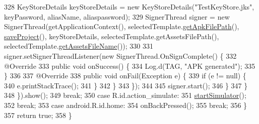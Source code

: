 \begin{DoxyCode}
328                                 KeyStoreDetails keyStoreDetails = \textcolor{keyword}{new} KeyStoreDetails(\textcolor{stringliteral}{"TestKeyStore.jks"}, 
      keyPassword, aliasName, aliaspassword);
329                                 SignerThread signer = \textcolor{keyword}{new} SignerThread(getApplicationContext(), 
      selectedTemplate.\hyperlink{interfaceorg_1_1buildmlearn_1_1toolkit_1_1model_1_1TemplateInterface_a1bca348acb3790aebce645c04a9e0945}{getApkFilePath}(), \hyperlink{classorg_1_1buildmlearn_1_1toolkit_1_1activity_1_1TemplateEditor_aaec7f80eb29a74505a25bed11c20c29d}{saveProject}(), keyStoreDetails, 
      selectedTemplate.getAssetsFilePath(), selectedTemplate.\hyperlink{interfaceorg_1_1buildmlearn_1_1toolkit_1_1model_1_1TemplateInterface_a5336064bba45a1ba2f6db891567e1b6e}{getAssetsFileName}());
330 
331                                 signer.setSignerThreadListener(\textcolor{keyword}{new} SignerThread.OnSignComplete() \{
332                                     @Override
333                                     \textcolor{keyword}{public} \textcolor{keywordtype}{void} onSuccess() \{
334                                         Log.d(TAG, \textcolor{stringliteral}{"APK generated"});
335                                     \}
336 
337                                     @Override
338                                     \textcolor{keyword}{public} \textcolor{keywordtype}{void} onFail(Exception e) \{
339                                         \textcolor{keywordflow}{if} (e != null) \{
340                                             e.printStackTrace();
341                                         \}
342                                     \}
343                                 \});
344 
345                                 signer.start();
346                         \}
347                     \}
348                 \}).show();
349                 \textcolor{keywordflow}{break};
350             \textcolor{keywordflow}{case} R.id.action\_simulate:
351                 \hyperlink{classorg_1_1buildmlearn_1_1toolkit_1_1activity_1_1TemplateEditor_a0f4842fdb6b28f218c6f2ac5c69e62e1}{startSimulator}();
352                 \textcolor{keywordflow}{break};
353             \textcolor{keywordflow}{case} android.R.id.home:
354                 onBackPressed();
355                 \textcolor{keywordflow}{break};
356         \}
357         \textcolor{keywordflow}{return} \textcolor{keyword}{true};
358     \}
\end{DoxyCode}
